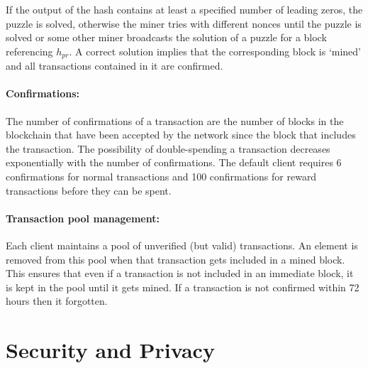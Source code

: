 \documentclass[]{report}   %
\begin{document}
If the output of the hash contains at least a specified number of leading zeros, the puzzle is solved, otherwise the miner tries with different nonces until the puzzle is solved or some other miner broadcasts the solution of a puzzle for a block referencing $h_{pr}$. A correct solution implies that the corresponding block is `mined' and all transactions contained in it are confirmed.

\paragraph{Confirmations:} The number of confirmations of a transaction are the number of blocks in the blockchain that have been accepted by the network since the block that includes the transaction. The possibility of double-spending a transaction decreases exponentially with the number of confirmations. The default client requires 6 confirmations for normal transactions and 100 confirmations for reward transactions before they can be spent.  

\paragraph{Transaction pool management:} Each client maintains a pool of unverified (but valid) transactions. An element is removed from this pool when that transaction gets included in a mined block. This ensures that even if a transaction is not included in an immediate block, it is kept in the pool until it gets mined. If a transaction is not confirmed within 72 hours then it forgotten. 

\section{Security and Privacy} 
\end{document}
